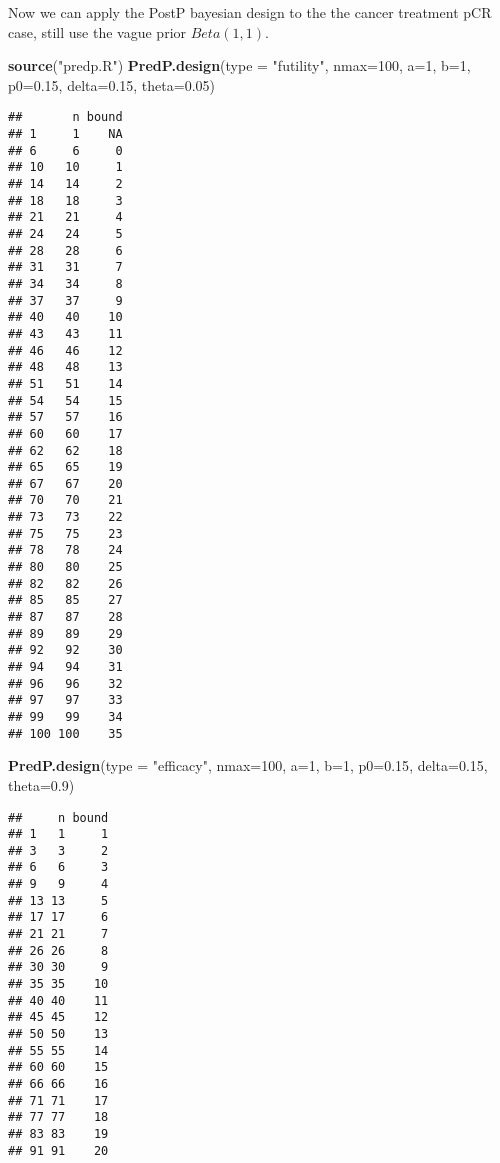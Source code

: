 \documentclass[]{article}
\newenvironment{Shaded}{\begin{snugshade}}{\end{snugshade}}
\newcommand{\KeywordTok}[1]{\textcolor[rgb]{0.13,0.29,0.53}{\textbf{{#1}}}}
\newcommand{\DataTypeTok}[1]{\textcolor[rgb]{0.13,0.29,0.53}{{#1}}}
\newcommand{\DecValTok}[1]{\textcolor[rgb]{0.00,0.00,0.81}{{#1}}}
\newcommand{\FloatTok}[1]{\textcolor[rgb]{0.00,0.00,0.81}{{#1}}}
\newcommand{\StringTok}[1]{\textcolor[rgb]{0.31,0.60,0.02}{{#1}}}
\newcommand{\NormalTok}[1]{{#1}}
\begin{document}
Now we can apply the PostP bayesian design to the the cancer treatment
pCR case, still use the vague prior \(Beta(1,1)\).

\begin{Shaded}
\begin{Highlighting}[]
\KeywordTok{source}\NormalTok{(}\StringTok{"predp.R"}\NormalTok{)}
\KeywordTok{PredP.design}\NormalTok{(}\DataTypeTok{type =} \StringTok{"futility"}\NormalTok{, }\DataTypeTok{nmax=}\DecValTok{100}\NormalTok{, }\DataTypeTok{a=}\DecValTok{1}\NormalTok{, }\DataTypeTok{b=}\DecValTok{1}\NormalTok{, }\DataTypeTok{p0=}\FloatTok{0.15}\NormalTok{, }\DataTypeTok{delta=}\FloatTok{0.15}\NormalTok{, }\DataTypeTok{theta=}\FloatTok{0.05}\NormalTok{)}
\end{Highlighting}
\end{Shaded}

\begin{verbatim}
##       n bound
## 1     1    NA
## 6     6     0
## 10   10     1
## 14   14     2
## 18   18     3
## 21   21     4
## 24   24     5
## 28   28     6
## 31   31     7
## 34   34     8
## 37   37     9
## 40   40    10
## 43   43    11
## 46   46    12
## 48   48    13
## 51   51    14
## 54   54    15
## 57   57    16
## 60   60    17
## 62   62    18
## 65   65    19
## 67   67    20
## 70   70    21
## 73   73    22
## 75   75    23
## 78   78    24
## 80   80    25
## 82   82    26
## 85   85    27
## 87   87    28
## 89   89    29
## 92   92    30
## 94   94    31
## 96   96    32
## 97   97    33
## 99   99    34
## 100 100    35
\end{verbatim}

\begin{Shaded}
\begin{Highlighting}[]
\KeywordTok{PredP.design}\NormalTok{(}\DataTypeTok{type =} \StringTok{"efficacy"}\NormalTok{, }\DataTypeTok{nmax=}\DecValTok{100}\NormalTok{, }\DataTypeTok{a=}\DecValTok{1}\NormalTok{, }\DataTypeTok{b=}\DecValTok{1}\NormalTok{, }\DataTypeTok{p0=}\FloatTok{0.15}\NormalTok{, }\DataTypeTok{delta=}\FloatTok{0.15}\NormalTok{, }\DataTypeTok{theta=}\FloatTok{0.9}\NormalTok{)}
\end{Highlighting}
\end{Shaded}

\begin{verbatim}
##     n bound
## 1   1     1
## 3   3     2
## 6   6     3
## 9   9     4
## 13 13     5
## 17 17     6
## 21 21     7
## 26 26     8
## 30 30     9
## 35 35    10
## 40 40    11
## 45 45    12
## 50 50    13
## 55 55    14
## 60 60    15
## 66 66    16
## 71 71    17
## 77 77    18
## 83 83    19
## 91 91    20
\end{verbatim}
\end{document}
